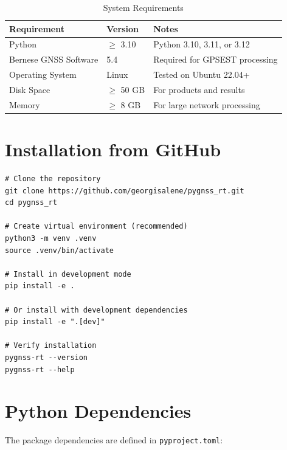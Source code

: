 \documentclass[11pt,a4paper,twoside]{report}
\newcommand{\code}[1]{\texttt{\small\color{primaryblue}#1}}
\begin{document}
\begin{table}[H]
\centering
\caption{System Requirements}
\label{tab:requirements}
\begin{tabular}{@{}llp{6cm}@{}}
\toprule
\textbf{Requirement} & \textbf{Version} & \textbf{Notes} \\
\midrule
Python & $\geq$ 3.10 & Python 3.10, 3.11, or 3.12 \\
Bernese GNSS Software & 5.4 & Required for GPSEST processing \\
Operating System & Linux & Tested on Ubuntu 22.04+ \\
Disk Space & $\geq$ 50 GB & For products and results \\
Memory & $\geq$ 8 GB & For large network processing \\
\bottomrule
\end{tabular}
\end{table}

\section{Installation from GitHub}

\begin{lstlisting}[style=bashstyle, caption={Installation Commands}, label={lst:install}]
# Clone the repository
git clone https://github.com/georgisalene/pygnss_rt.git
cd pygnss_rt

# Create virtual environment (recommended)
python3 -m venv .venv
source .venv/bin/activate

# Install in development mode
pip install -e .

# Or install with development dependencies
pip install -e ".[dev]"

# Verify installation
pygnss-rt --version
pygnss-rt --help
\end{lstlisting}

\section{Python Dependencies}

The package dependencies are defined in \code{pyproject.toml}:
\end{document}
